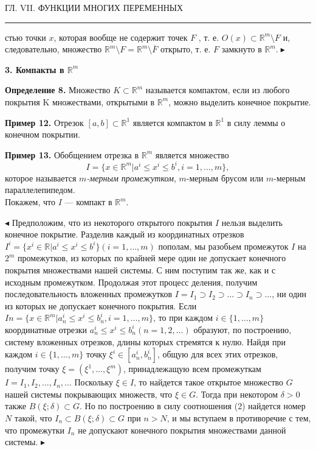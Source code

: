 \documentclass[a4paper, 12pt]{book}
\begin{document}
    \begin{center}
        \begin{spacing}
        
                    ГЛ. VII. ФУНКЦИИ МНОГИХ ПЕРЕМЕННЫХ
            \noindent\rule{\textwidth}{1pt}
	\end{spacing}
    \end{center}
    стью точки $x$, которая вообще не содержит точек $F$ , т. е. $O(x) \subset \mathbb{R}^m \setminus F$
    и, следовательно, множество $\mathbb{R}^m \setminus F = \mathbb{R}^m \setminus \overline{F}$ открыто, т. е. $F$ замкнуто
    в $\mathbb{R}^m. \blacktriangleright$
    {\setlength{\parskip}{18pt}
    \par\textbf{3. Компакты в $\mathbb{R}^m$}}
    \par\textbf{Определение 8.} Множество $K \subset \mathbb{R}^m$ называется компактом, если из любого покрытия K множествами, открытыми в $\mathbb{R}^m$, можно выделить конечное покрытие.
    \par\textbf{Пример 12.} Отрезок $[a, b] \subset \mathbb{R}^1$ является компактом в $\mathbb{R}^1$ в силу леммы о конечном покрытии.
    \par\textbf{Пример 13.} Обобщением отрезка в $\mathbb{R}^m$ является множество \[I = \{x \in \mathbb{R}^m | a^i \le x^i \le b^i , i = 1, \dots , m\},\] которое называется $m$\textit{-мерным промежутком}, $m$-мерным брусом или $m$-мерным параллелепипедом.
    \\Покажем, что $I$ — компакт в $\mathbb{R}^m$.
    \par $\blacktriangleleft$ Предположим, что из некоторого открытого покрытия $I$ нельзя выделить конечное покрытие. Разделив каждый из координатных отрезков $I^i = \{x^i \in \mathbb{R} | a^i \le x^i \le b^i \} (i = 1, \dots , m)$ пополам, мы разобьем промежуток $I$ на $2^m$ промежутков, из которых по крайней мере один не допускает конечного покрытия множествами нашей системы. С ним поступим так же, как и с исходным промежутком. Продолжая этот процесс деления, получим последовательность вложенных промежутков $I = I_1 \supset I_2 \supset \dots \supset I_n \supset \dots$, ни один из которых не допускает конечного покрытия. Если $In = \{x \in \mathbb{R}^m | a^i_n \le x^i \le b^i_n , i = 1, \dots , m\}$, то при каждом $i \in \{1, \dots , m\}$ координатные отрезки $a^i_n \le x^i \le b^i_n (n = 1, 2, \dots )$ образуют, по построению, систему вложенных отрезков, длины которых стремятся к нулю. Найдя при каждом $i \in \{1, \dots , m\}$ точку $\xi^i \in [a^i_n, b^i_n]$, общую для всех этих отрезков, получим точку $\xi = (\xi^1 , \dots , \xi^m)$, принадлежащую всем промежуткам $I = I_1, I_2, \dots , I_n, \dots$ Поскольку $\xi \in I$, то найдется такое открытое множество $G$ нашей системы покрывающих множеств, что $\xi \in G$. Тогда при некотором $\delta > 0$ также $B(\xi; \delta) \subset G$. Но по построению в силу соотношения (2) найдется номер $N$ такой, что $I_n \subset B(\xi; \delta) \subset G$ при $n > N$, и мы вступаем в противоречие с тем, что промежутки $I_n$ не допускают конечного покрытия множествами данной системы. $\blacktriangleright$
\end{document}
